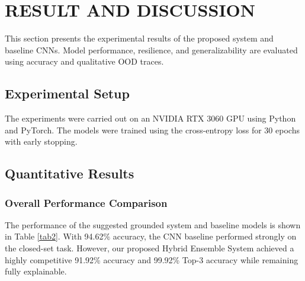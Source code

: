 \documentclass[conference]{IEEEtran}
\begin{document}
\section{RESULT AND DISCUSSION}
This section presents the experimental results of the proposed system and baseline CNNs. Model performance, resilience, and generalizability are evaluated using accuracy and qualitative OOD traces.

\subsection{Experimental Setup}
The experiments were carried out on an NVIDIA RTX 3060 GPU using Python and PyTorch. The models were trained using the cross-entropy loss for 30 epochs with early stopping.

\subsection{Quantitative Results}

\subsubsection{Overall Performance Comparison} 
The performance of the suggested grounded system and baseline models is shown in Table \ref{tab2}. With 94.62\% accuracy, the CNN baseline performed strongly on the closed-set task. However, our proposed Hybrid Ensemble System achieved a highly competitive 91.92\% accuracy and 99.92\% Top-3 accuracy while remaining fully explainable.

\begin{table}[htbp]
\caption{Performance Comparison of Baseline Models and Proposed Model}
\begin{center}
\label{tab2}
\end{center}
\end{table}
\end{document}
